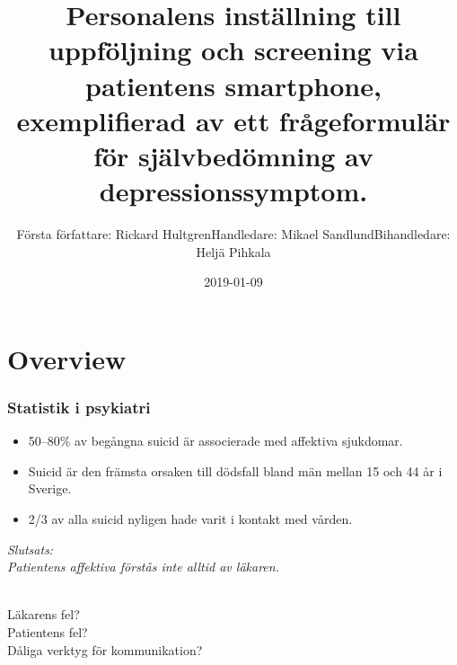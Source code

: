 \documentclass[english]{beamer}
\date{2019-01-09}
\begin{document}
\title{Personalens inst{\"a}llning till uppf{\"o}ljning och screening via patientens smartphone, exemplifierad av ett fr{\aa}geformul{\"a}r f{\"o}r sj{\"a}lvbed{\"o}mning av depressionssymptom.}
\author[]{F{\"o}rsta f{\"o}rfattare: Rickard Hultgren\newline Handledare: Mikael Sandlund\newline Bihandledare: Helj{\"a} Pihkala}


\begin{frame}
	\titlepage
\end{frame}


\section{Overview}
\begin{frame}
	\frametitle{Statistik i psykiatri}

	\begin{itemize}
	\item 50--80\% av beg{\aa}ngna suicid {\"a}r associerade med affektiva sjukdomar.
	\item Suicid {\"a}r den fr{\"a}msta orsaken till d{\"o}dsfall bland m{\"a}n mellan 15 och 44 {\aa}r i Sverige.
	\item 2/3 av alla suicid nyligen hade varit i kontakt med v{\aa}rden.
	\end{itemize}

	\pause

	\textit{Slutsats:\\Patientens affektiva f{\"o}rst{\aa}s inte alltid av l{\"a}karen.}\\\ \\

\pause

L{\"a}karens fel?\\
Patientens fel?\\
D{\aa}liga verktyg f{\"o}r kommunikation?
\end{frame}
\end{document}
